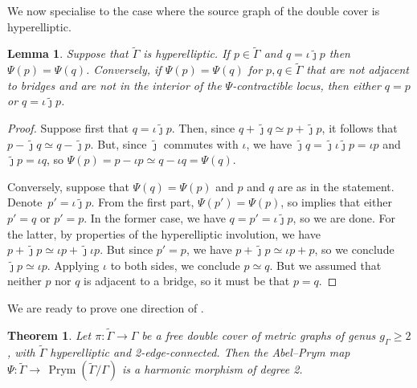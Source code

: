 \documentclass[11pt]{article}
\newtheorem{theorem}[theo]{Theorem}
\newtheorem{lemma}[theo]{Lemma}
\theoremstyle{definition}
\numberwithin{equation}{section}
\theoremstyle{definition}
\newcommand{\tGa}{\widetilde{\Gamma}}
\newcommand{\tj}{\widetilde{\jmath}}
\newcommand{\wt}[1]{\widetilde{#1}}
\DeclareMathOperator{\Prym}{Prym}
\begin{document}
We now specialise to the case where the source graph of the double cover is hyperelliptic.

\begin{lemma}\label{shapeOfFibres}
   Suppose that $\wt\Gamma$ is hyperelliptic. If $p\in\wt\Gamma$ and $q = \iota\tj p$ then $\Psi(p) = \Psi(q)$.   Conversely, if  $\Psi(p) = \Psi(q)$ for  $p,q\in\wt\Gamma$ 
   that are not adjacent to bridges and are not in the interior of the $\Psi$-contractible locus,
then either $q = p$ or $q = \iota\tj p$.
\end{lemma}
\begin{proof}
   
    Suppose first that  $q= \iota\tj p$. Then, since $q + \tj q\simeq p + \tj p$, it follows that $p - \tj q \simeq q - \tj p$.  But, since $\tj$ commutes with $\iota$, we have $\tj q = \tj\iota\tj p = \iota p$ and $\tj p = \iota q$, so $\Psi(p) = p-\iota p\simeq q-\iota q = \Psi(q)$. 
  
 
 Conversely, suppose that $\Psi(q) = \Psi(p)$ and $p$ and $q$ are as in the statement. Denote~$p' =\iota\tj p$. From the first part, $\Psi(p') = \Psi(p)$, so   implies that either $p' = q$ or $p' = p$.  In the former case, 
  we have $q = p' = \iota\tj p$, so 
 we are done.  For the latter, by properties of the hyperelliptic involution, we have $p + \tj p\simeq \iota p + \tj\iota p$. But since $p'=p$, we have $p + \tj p\simeq \iota p + p$, so we conclude $\tj p\simeq \iota p$. Applying $\iota$ to both sides, we conclude $p\simeq q$. But we assumed that neither  $p$ nor $q$  is adjacent to a bridge, so it must be that $p=q$. 
\end{proof}

We are ready to prove one direction of . 

\begin{theorem}\label{thm:ifHyperelliptic}
    Let $\pi\colon \tGa\to \Gamma$ be a  free double cover of metric graphs of genus $g_{\Gamma}\geq 2$, with $\wt\Gamma$ hyperelliptic and 2-edge-connected. Then the Abel--Prym map  $\Psi\colon \tGa\to \,\Prym(\tGa/\Gamma)$ is a harmonic morphism of degree 2.
\end{theorem}
 
\end{document}
